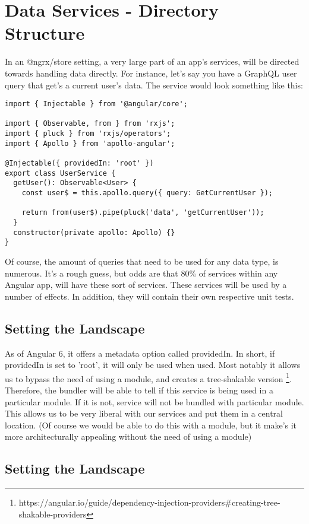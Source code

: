 \maketitle{}
\section{ Data Services - Directory Structure }

In an @ngrx/store setting, a very large part of an app's services, will be
directed towards handling data directly. For instance, let's say you have a
GraphQL user query that get's a current user's data. The service would look
something like this:
\begin{lstlisting}
import { Injectable } from '@angular/core';

import { Observable, from } from 'rxjs';
import { pluck } from 'rxjs/operators';
import { Apollo } from 'apollo-angular';

@Injectable({ providedIn: 'root' })
export class UserService {
  getUser(): Observable<User> {
    const user$ = this.apollo.query({ query: GetCurrentUser });

    return from(user$).pipe(pluck('data', 'getCurrentUser'));
  }
  constructor(private apollo: Apollo) {}
}
\end{lstlisting}

Of course, the amount of queries that need to be used for any data type, is
numerous. It's a rough guess, but odds are that 80\% of services within any
Angular app, will have these sort of services. These services will be used by a
number of effects. In addition, they will contain their own respective unit
tests.

\subsection{ Setting the Landscape }
As of Angular 6, it offers a metadata option called providedIn. In short, if
providedIn is set to 'root', it will only be used when used. Most notably it
allows us to bypass the need of using a module, and creates a tree-shakable
version \footnote{https://angular.io/guide/dependency-injection-providers\#creating-tree-shakable-providers}.
Therefore, the bundler will be able to tell if this service is being used in a
particular module. If it is not, service will not be bundled with particular
module. This allows us to be very liberal with our services and put them in a
central location. (Of course we would be able to do this with a module, but
it make's it more architecturally appealing without the need of using a
module)

\subsection{ Setting the Landscape }
